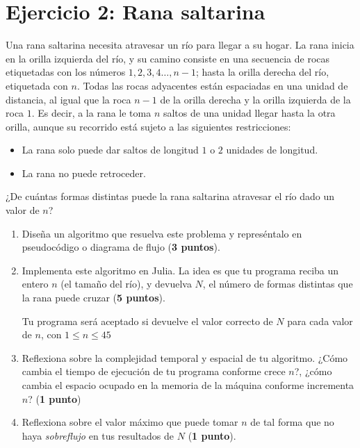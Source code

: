 \documentclass[a4paper,12pt]{article}
\begin{document}
\section*{Ejercicio 2: Rana saltarina}
Una rana saltarina necesita atravesar un río para
llegar a su hogar. La rana inicia en la orilla izquierda del río, y su camino consiste en una
secuencia de rocas etiquetadas con los números $1, 2, 3, 4 
\dots, n-1$; hasta la orilla derecha del río, etiquetada con $n$. Todas las rocas adyacentes están espaciadas en una unidad de distancia, al igual que la roca $n-1$ de la orilla derecha y la orilla izquierda de la roca $1$. Es decir, a la rana le toma $n$ saltos de una unidad llegar hasta la otra orilla, aunque
su recorrido está sujeto a las siguientes restricciones:

    \begin{itemize}
        \item La rana solo puede dar saltos de longitud
        $1$ o $2$ unidades de longitud. 
        \item La rana no puede retroceder. 
    \end{itemize}
    
¿De cuántas formas distintas puede la rana saltarina
atravesar el río dado un valor de $n$?

    \begin{enumerate}
        \item Diseña un algoritmo que resuelva este 
        problema y represéntalo en pseudocódigo
        o diagrama de flujo (\textbf{3 puntos}).
        \item Implementa este algoritmo en Julia. La 
        idea es que tu programa reciba un entero $n$
        (el tamaño del río), y devuelva $N$, el número
        de formas distintas que la rana puede cruzar
        (\textbf{5 puntos}). 

        Tu programa será aceptado si devuelve el valor correcto
        de $N$ para cada valor de $n$, con $1\leq n\leq 45$
        \item Reflexiona sobre la complejidad temporal
        y espacial de tu algoritmo. ¿Cómo cambia el tiempo
        de ejecución de tu programa conforme crece $n$?, 
        ¿cómo cambia el espacio ocupado en la memoria de 
        la máquina conforme incrementa $n$?
        (\textbf{1 punto})
        \item Reflexiona sobre el valor máximo que 
        puede tomar $n$ de tal forma que no haya
        \textit{sobreflujo} en tus resultados de $N$
        (\textbf{1 punto}).
    \end{enumerate}
\end{document}
